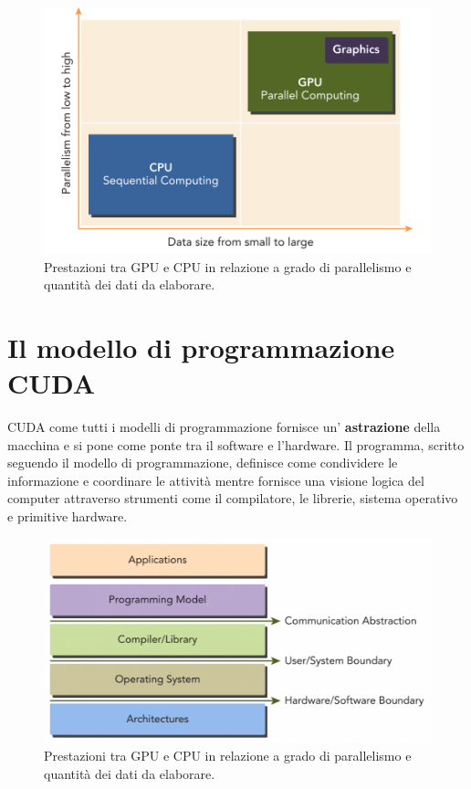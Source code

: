 \begin{figure}[H]
\centering
\includegraphics[scale=0.6]{img/Performancecpu-gpu.png}
\caption{Prestazioni tra GPU e CPU in relazione a grado di parallelismo e quantità dei dati da elaborare.}
\end{figure}

\section{Il modello di programmazione CUDA}
CUDA come tutti i modelli di programmazione fornisce un’ \textbf{astrazione} della macchina e si  pone come ponte tra il software e l’hardware. Il programma, scritto seguendo il modello di programmazione, definisce come condividere le informazione e coordinare le attività mentre fornisce una visione logica del computer attraverso strumenti come il compilatore, le librerie, sistema operativo e primitive hardware.


\begin{figure}[H]
\centering
\includegraphics[scale=0.6]{img/modello.png}
\caption{Prestazioni tra GPU e CPU in relazione a grado di parallelismo e quantità dei dati da elaborare.}
\end{figure}


